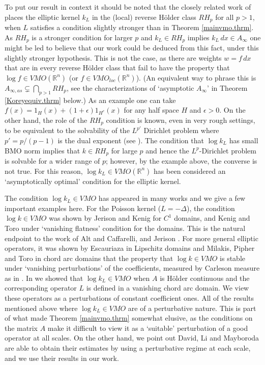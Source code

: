 \documentclass[11pt, a4paper,leqno]{amsart}
\theoremstyle{plain}
\theoremstyle{definition}
\theoremstyle{remark}
\numberwithin{equation}{section}
\newcommand{\rn}{\mathbb{R}^n}
\begin{document}
To put our result in context it should be noted that the closely related work of \cite{DPP} places the elliptic kernel $k_L$ in the (local) reverse H\"older class $RH_p$ for all $p > 1$, when $L$ satisfies a condition slightly stronger than in Theorem \ref{mainvmo.thrm}. As $RH_p$ is a stronger condition for larger $p$ and $k_L \in RH_p$ implies $k_L\, dx \in A_\infty$ one might be led to believe that our work could be deduced from this fact, under this slightly stronger hypothesis. This is not the case, as there are weights $w = f \, dx$ that are in every reverse H\"older class that fail to have the property that $\log f \in VMO(\rn)$ (or $f \in VMO_{loc}(\rn)$). (An equivalent way to phrase this is $A_{\infty, as} \subsetneq \bigcap_{p>1} RH_p$, see the characterizations of `asymptotic $A_\infty$' in Theorem \ref{Koreyequiv.thrm} below.) As an example one can take $f(x) = 1_H(x) + (1+\epsilon)1_{H^c}(x)$ for any half space $H$ and $\epsilon > 0$. On the other hand, the role of the $RH_p$ condition is known, even in very rough settings, to be equivalent to the solvability of the $L^{p'}$ Dirichlet problem where $p' = p/(p-1)$ is the dual exponent (see \cite[Proposition 4.5]{HofPLe}). The condition that $\log k_L$ has small BMO norm implies that $k \in RH_p$ for large $p$ and hence the $L^p$-Dirichlet problem is solvable for a wider range of $p$; however, by the example above, the converse is not true. For this reason, $\log k_L \in VMO(\rn)$ has been considered an `asymptotically optimal' condition for the elliptic kernel. 

The condition $\log k_L \in VMO$ has appeared in many works and we give a few important examples here. For the Poisson kernel ($L = -\Delta$), the condition $\log k \in VMO$ was shown by Jerison and Kenig \cite{JK-VMO} for $C^1$ domains, and Kenig and Toro \cite{KT-Duke} under `vanishing flatness' condition for the domains. This is the natural endpoint to the work of Alt and Caffarelli, and Jerison \cite{AC, Jerison-Calpha}. For more general elliptic operators, it was shown by Escauriaza \cite{Esc} in Lipschitz domains and Milakis, Pipher and Toro \cite{MPT} in chord arc domains that the property that $\log k \in VMO$ is stable under `vanishing perturbations' of the coefficients, measured by Carleson measure as in \cite{FKP}. In \cite{BTZ} we
showed that $\log k_L \in VMO$ when $A$ is H\"older continuous and the corresponding operator $L$ is defined in a vanishing chord arc domain. We view these operators as a perturbations of constant coefficient ones. All of the results mentioned above where $\log k_L \in VMO$ are of a perturbative nature. This is part of what made Theorem \ref{mainvmo.thrm} somewhat elusive, as the conditions on the matrix $A$ make it difficult to view it as a `suitable' perturbation of a good operator at all scales. On the other hand, we point out David, Li and Mayboroda \cite{DLM} are able to obtain their estimates by using a perturbative regime at each scale, and we use their results in our work. 
\end{document}
